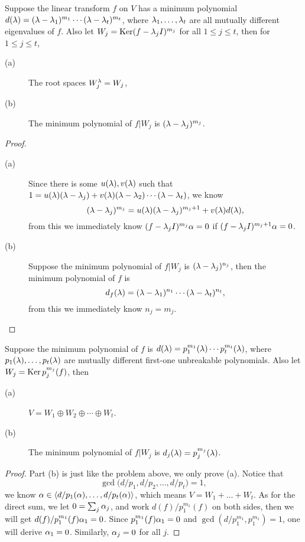 \begin{pro}%
	Suppose the linear transform $f$ on $V$ has a minimum polynomial $d(\lambda)=(\lambda-\lambda_1)^{m_1}\cdots(\lambda-\lambda_t)^{m_t}$, where $\lambda_1,\dots,\lambda_t$ are all mutually different eigenvalues of $f$. Also let $W_j=\operatorname*{Ker} (f-\lambda_j I)^{m_j}$ for all $1\leq j\leq t$, then for $1\leq j\leq t$,
	\begin{description}
	\item[(a)] The root spaces $W_j^{\lambda}=W_j$, 
	\item[(b)] The minimum polynomial of $f|W_j$ is $(\lambda-\lambda_j)^{m_j}$.
	\end{description}
\end{pro}
\begin{proof}
	\begin{description}
	\item[(a)] Since there is some $u(\lambda),v(\lambda)$ such that $1=u(\lambda)(\lambda-\lambda_j)+v(\lambda)(\lambda-\lambda_2)\cdots(\lambda-\lambda_t)$, we know 
	\[(\lambda-\lambda_j)^{m_j}=u(\lambda)(\lambda-\lambda_j)^{m_j+1}+v(\lambda)d(\lambda),\]
	 from this we immediately know $(f-\lambda_j I)^{m_j}\alpha=0$ if $(f-\lambda_j I)^{m_j+1}\alpha=0$.
	\item[(b)] Suppose the minimum polynomial of $f|W_j$ is $(\lambda-\lambda_j)^{n_j}$, then the minimum polynomial of $f$ is
	\[d_f(\lambda)=(\lambda-\lambda_1)^{n_1}\cdots(\lambda-\lambda_t)^{n_t},\]
	from this we immediately know $n_j=m_j$.
	\end{description}
\end{proof}

\begin{pro}%
	Suppose the minimum polynomial of $f$ is $d(\lambda)=p_1^{m_1}(\lambda)\cdots p_t^{m_t}(\lambda)$, where $p_1(\lambda),\dots,p_t(\lambda)$ are mutually different first-one unbreakable polynomials. Also let $W_j=\operatorname*{Ker} p_j^{m_j}(f)$, then
	\begin{description}
	\item[(a)] $V=W_1\oplus W_2\oplus\cdots\oplus W_t$.
	\item[(b)] The minimum polynomial of $f|W_j$ is $d_j(\lambda)=p_j^{m_j}(\lambda)$.
	\end{description}
\end{pro}
\begin{proof}
	Part (b) is just like the problem above, we only prove (a). Notice that 
	\[\gcd\big(d/p_1,d/p_2,\dots,d/p_t\big)=1,\]
	we know $\alpha\in\left\langle d/p_1(\alpha),\dots,d/p_t(\alpha)\right\rangle$, which means $V=W_1+\dots+W_t$. As for the direct sum, we let $0=\sum_j \alpha_j$, and work $d(f)/p_1^{m_1}(f)$ on both sides, then we will get $d(f)/p_1^{m_1}(f)\alpha_1=0$. Since $p_1^{m_1}(f)\alpha_1=0$ and $\gcd(d/p_1^{m_1},p_1^{m_1})=1$, one will derive $\alpha_1=0$. Similarly, $\alpha_j=0$ for all $j$.
\end{proof}

